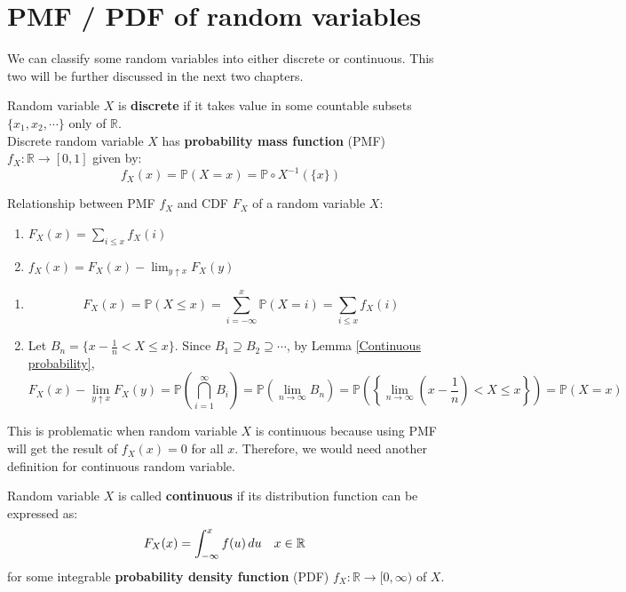 \documentclass{huhtakm-template-book}
\newcommand{\prob}{\mathbb{P}}
\begin{document}
\section{PMF / PDF of random variables}
We can classify some random variables into either discrete or continuous. This two will be further discussed in the next two chapters.
\begin{defn}
	Random variable $X$ is \textbf{discrete} if it takes value in some countable subsets $\{x_{1},x_{2},\cdots\}$ only of $\mathbb{R}$.\\
	Discrete random variable $X$ has \textbf{probability mass function} (PMF) $f_{X}:\mathbb{R}\to [0,1]$ given by: 
	\begin{equation*}
		f_{X}(x)=\prob(X=x)=\prob\circ X^{-1}(\{x\})
	\end{equation*}
\end{defn}
\begin{lem}
	\label{Relationship between pmf and cdf}
	Relationship between PMF $f_{X}$ and CDF $F_{X}$ of a random variable $X$:
	\begin{enumerate}
		\item $F_{X}(x)=\sum_{i\leq x}f_{X}(i)$
		\item $f_{X}(x)=F_{X}(x)-\lim_{y\uparrow x}F_{X}(y)$
	\end{enumerate}
\end{lem}
\begin{proofing}
	\begin{enumerate}
		\item 
		\begin{equation*}
			F_{X}(x)=\prob(X\leq x)=\sum_{i=-\infty}^{x}\prob(X=i)=\sum_{i\leq x}f_{X}(i)
		\end{equation*}
		\item Let $B_{n}=\{x-\frac{1}{n}<X\leq x\}$. Since $B_{1}\supseteq B_{2}\supseteq\cdots$, by Lemma \ref{Continuous probability},
		\begin{equation*}
			F_{X}(x)-\lim_{y\uparrow x}F_{X}(y)=\prob\left(\bigcap_{i=1}^{\infty}B_{i}\right)=\prob\left(\lim_{n\to\infty}B_{n}\right)=\prob\left(\left\{\lim_{n\to\infty}\left(x-\frac{1}{n}\right)<X\leq x\right\}\right)=\prob(X=x)
		\end{equation*}
	\end{enumerate}
\end{proofing}
This is problematic when random variable $X$ is continuous because using PMF will get the result of $f_{X}(x)=0$ for all $x$. Therefore, we would need another definition for continuous random variable.
\begin{defn}
	Random variable $X$ is called \textbf{continuous} if its distribution function can be expressed as:
	\begin{align*}
		F_{X}(x)&=\int_{-\infty}^{x}f(u)\,du & x&\in\mathbb{R}
	\end{align*}
	for some integrable \textbf{probability density function} (PDF) $f_{X}:\mathbb{R}\to [0,\infty)$ of $X$. 
\end{defn}
\end{document}
